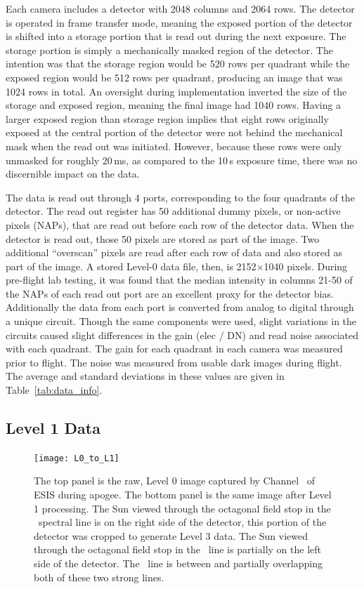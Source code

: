 Each camera includes a detector with 2048 columns and 2064 rows.  The detector is operated in frame transfer mode, meaning the exposed portion of the detector is shifted into a storage portion that is read out during the next exposure. The storage portion is simply a mechanically masked region of the detector. The intention was that the storage region would be 520 rows per quadrant while the exposed region would be 512 rows per quadrant, producing an image that was 1024 rows in total.  An oversight during implementation inverted the size of the storage and exposed region, meaning the final image had 1040 rows.  Having a larger exposed region than storage region implies that eight rows originally exposed at the central portion of the detector were not behind the mechanical mask when the read out was initiated. However, because these rows were only unmasked for roughly 20\,ms, as compared to the 10\,s exposure time, there was no discernible impact on the data. 

The data is read out through 4 ports, corresponding to the four quadrants of the detector.  The read out register has 50 additional dummy pixels, or non-active pixels (NAPs), that are read out before each row of the detector data.  When the detector is read out, those 50 pixels are stored as part of the image.  Two additional ``overscan'' pixels are read after each row of data and also stored as part of the image.  A stored Level-0 data file, then, is 2152$\times$1040 pixels.   During pre-flight lab testing, it was found that the median intensity in columns 21-50 of the NAPs of each read out port are an excellent proxy for the detector bias.  Additionally the data from each port is converted from analog to digital through a unique circuit.  Though the same components were used, slight variations in the circuits caused slight differences in the gain (elec / DN) and read  noise associated with each quadrant.  The gain for each quadrant in each camera was measured prior to flight.  The noise was measured from usable dark images during flight.  The average and standard deviations in these values are given in Table~\ref{tab:data_info}.
    
\subsection{Level 1 Data}
	    \begin{figure}
	    	\centering
	    	\texttt{[image: L0\_to\_L1]}
	    	\caption{The top panel is the raw, Level 0 image captured by Channel \ of ESIS during apogee. The bottom panel is the same image after Level 1 processing. The Sun viewed through the octagonal field stop in the \ov \ spectral line is on the right side of the detector, this portion of the detector was cropped to generate Level 3 data.  The Sun viewed through the octagonal field stop in the \hei \ line is partially on the left side of the detector. The \mgxbright \ line is between and partially overlapping both of these two strong lines.}
	    	\label{fig:L0_to_L1}
	    \end{figure}
    	
